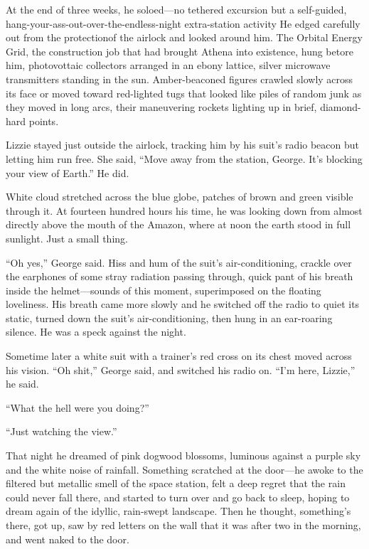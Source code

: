 At the end of three weeks, he soloed—no tethered excursion but a self-guided, hang-your-ass-out-over-the-endless-night extra-station activity He edged carefully out from the protectionof the airlock and looked around him. The Orbital Energy Grid, the construction job that had brought Athena into existence, hung betore him, photovottaic collectors arranged in an ebony lattice, silver microwave transmitters standing in the sun. Amber-beaconed figures crawled slowly across its face or moved toward red-lighted tugs that looked like piles of random junk as they moved in long arcs, their maneuvering rockets lighting up in brief, diamond-hard points.

Lizzie stayed just outside the airlock, tracking him by his suit's radio beacon but letting him run free. She said, ``Move away from the station, George. It's blocking your view of Earth.'' He did.

White cloud stretched across the blue globe, patches of brown and green visible through it. At fourteen hundred hours his time, he was looking down from almost directly above the mouth of the Amazon, where at noon the earth stood in full sunlight. Just a small thing.

``Oh yes,'' George said. Hiss and hum of the suit's air-conditioning, crackle over the earphones of some stray radiation passing through, quick pant of his breath inside the helmet—sounds of this moment, superimposed on the floating loveliness. His breath came more slowly and he switched off the radio to quiet its static, turned down the suit's air-conditioning, then hung in an ear-roaring silence. He was a speck against the night.

Sometime later a white suit with a trainer's red cross on its chest moved across his vision. ``Oh shit,'' George said, and switched his radio on. ``I'm here, Lizzie,'' he said.

``What the hell were you doing?''

``Just watching the view.''

That night he dreamed of pink dogwood blossoms, luminous against a purple sky and the white noise of rainfall. Something scratched at the door—he awoke to the filtered but metallic smell of the space station, felt a deep regret that the rain could never fall there, and started to turn over and go back to sleep, hoping to dream again of the idyllic, rain-swept landscape. Then he thought, something's there, got up, saw by red letters on the wall that it was after two in the morning, and went naked to the door.


